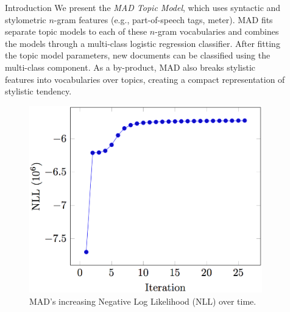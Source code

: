 \documentclass[final]{beamer}
\newlength{\sepwid}
\newlength{\onecolwid}
\newlength{\twocolwid}
\begin{document}
\begin{frame}[t]
\begin{columns}[t]
\begin{column}{\onecolwid}
\begin{block}{Introduction}
We present the \textit{MAD Topic Model}, which uses  syntactic and stylometric $n$-gram features (e.g., part-of-speech tags, meter). MAD fits separate topic models to each of these $n$-gram vocabularies and  combines the models through a multi-class logistic regression classifier. After fitting the topic model parameters, new documents can be classified using the multi-class component. As a by-product, MAD also breaks stylistic features into vocabularies over topics, creating a compact representation of stylistic tendency.

\begin{figure}
\centering
\includegraphics[width=\linewidth]{nll.png}
\caption{MAD's increasing Negative Log Likelihood (NLL) over time.}
\end{figure}

\end{block}




\end{column} %

\begin{column}{\sepwid}\end{column} %

\begin{column}{\twocolwid} %

\begin{columns}[t,totalwidth=\twocolwid] %


\end{columns}
\end{column}
\end{columns}
\end{frame}
\end{document}

